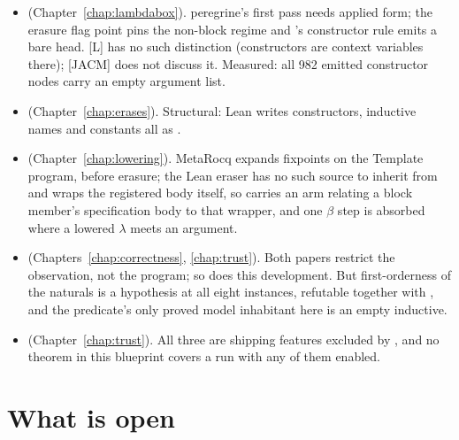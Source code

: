 \begin{itemize}
\item {} (Chapter~\ref{chap:lambdabox}). peregrine's first pass needs
applied form; the erasure flag point pins the non-block regime and \Erases{}'s constructor rule
emits a bare head. [L] has no such distinction (constructors are context variables there); [JACM] does
not discuss it. Measured: all 982 emitted constructor nodes carry an empty argument list.
\item {} (Chapter~\ref{chap:erases}). Structural: Lean
writes constructors, inductive names and constants all as .
\item {} (Chapter~\ref{chap:lowering}). MetaRocq expands
fixpoints on the Template program, before erasure; the Lean eraser has no such source to inherit
from and wraps the registered body itself, so \Lower{} carries an arm relating a block member's
specification body to that wrapper, and one $\beta$ step is absorbed where a lowered
$\lambda$ meets an argument.
\item {} (Chapters~\ref{chap:correctness}, \ref{chap:trust}). Both
papers restrict the observation, not the program; so does this development. But first-orderness of
the naturals is a hypothesis at all eight instances, refutable together with ,
and the predicate's only proved model inhabitant here is an empty inductive.
\item {} (Chapter~\ref{chap:trust}). All
three are shipping features excluded by , and no theorem in this blueprint
covers a run with any of them enabled.
\end{itemize}

\section{What is open}
\label{sec:intro:open}

